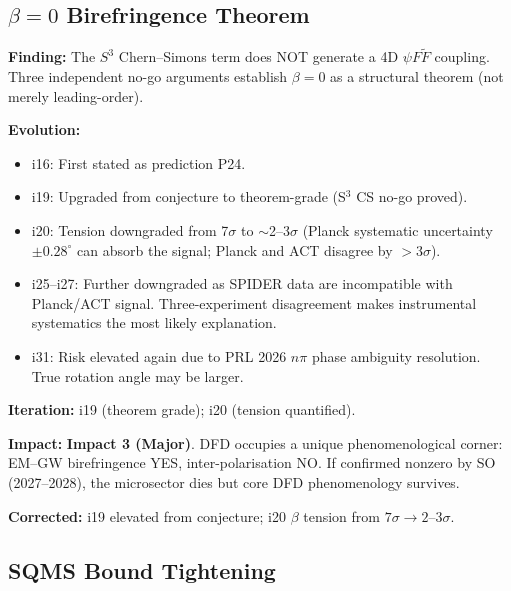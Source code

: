 \documentclass[11pt,a4paper]{article}
\newcommand{\impthree}{\textcolor{impact3}{\textbf{Impact 3 (Major)}}}
\begin{document}
\subsection{$\beta = 0$ Birefringence Theorem}
\label{sec:beta0}

\begin{tcolorbox}[colback=orange!5!white, colframe=orange!70!black,
  title=\textbf{$\beta = 0$ Cosmic Birefringence Theorem --- Iterations 19--27}]

\textbf{Finding:} The $S^3$ Chern--Simons term does NOT generate a 4D
$\psi F\tilde{F}$ coupling. Three independent no-go arguments establish
$\beta = 0$ as a structural theorem (not merely leading-order).

\textbf{Evolution:}
\begin{itemize}
  \item i16: First stated as prediction P24.
  \item i19: Upgraded from conjecture to theorem-grade (S$^3$ CS no-go proved).
  \item i20: Tension downgraded from 7$\sigma$ to $\sim$2--3$\sigma$
    (Planck systematic uncertainty $\pm 0.28^\circ$ can absorb the signal;
    Planck and ACT disagree by $>3\sigma$).
  \item i25--i27: Further downgraded as SPIDER data are incompatible with
    Planck/ACT signal. Three-experiment disagreement makes instrumental
    systematics the most likely explanation.
  \item i31: Risk elevated again due to PRL 2026 $n\pi$ phase ambiguity
    resolution. True rotation angle may be larger.
\end{itemize}

\textbf{Iteration:} i19 (theorem grade); i20 (tension quantified).

\textbf{Impact:} \impthree. DFD occupies a unique phenomenological corner:
EM--GW birefringence YES, inter-polarisation NO. If confirmed nonzero by
SO (2027--2028), the microsector dies but core DFD phenomenology survives.

\textbf{Corrected:} i19 elevated from conjecture; i20 $\beta$ tension
from $7\sigma \to 2$--$3\sigma$.

\end{tcolorbox}

\subsection{SQMS Bound Tightening}
\label{sec:sqms}
\end{document}
